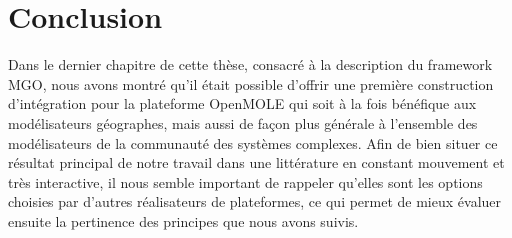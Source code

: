 \graphicspath{{FigureConclusion/}}

\chapter{Conclusion}

\startcontents[chapters]
\Mprintcontents





Dans le dernier chapitre de cette thèse, consacré à la description du framework MGO, nous avons montré qu'il était possible d'offrir une première construction d'intégration pour la plateforme OpenMOLE qui soit à la fois bénéfique aux modélisateurs géographes, mais aussi de façon plus générale à l'ensemble des modélisateurs de la communauté des systèmes complexes. Afin de bien situer ce résultat principal de notre travail dans une littérature en constant mouvement et très interactive, il nous semble important de rappeler qu'elles sont les options choisies par d'autres réalisateurs de plateformes, ce qui permet de mieux évaluer ensuite la pertinence des principes que nous avons suivis.

